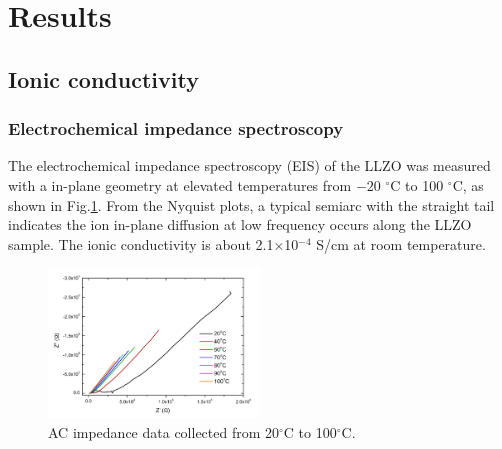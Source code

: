 \documentclass[twoside,twocolumn,9pt]{article}
\begin{document}
%

%

\section{Results}

\subsection{Ionic conductivity}

\subsubsection{Electrochemical impedance spectroscopy}

The electrochemical impedance spectroscopy (EIS) of the LLZO was measured with a in-plane geometry at elevated temperatures from $-20$ $^\circ$C to 100 $^\circ$C, as shown in  Fig.\ref{fig:impedance}.
From the Nyquist plots, a typical semiarc with the straight tail indicates the ion in-plane diffusion at low frequency occurs along the LLZO sample.
The ionic conductivity is about 2.1$\times$10$^{-4}$ S/cm at room temperature.

\begin{figure}[t]
\centering
\includegraphics[width=0.5\textwidth]{Pics/Nyquist.pdf}
\caption{AC impedance data collected from 20$^\circ$C to 100$^\circ$C.}
\label{fig:impedance}
\end{figure}
\end{document}
